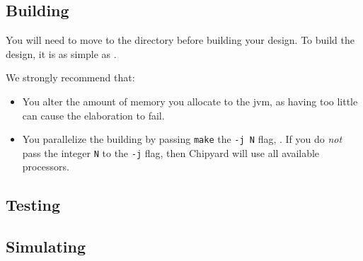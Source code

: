 \subsection{Building}\label{sec:Custom_Config-Building}
You will need to move to the  directory before building your design.
To build the design, it is as simple as .

We strongly recommend that:
\begin{itemize}
\item You alter the amount of memory you allocate to the \Gls{jvm}, as having too little can cause the \gls{elaboration} to fail.
\item You parallelize the building by passing \texttt{make} the \texttt{-j N} flag, .
  If you do \emph{not} pass the integer \texttt{N} to the \texttt{-j} flag, then Chipyard will use all available processors.
\end{itemize}

\subsection{Testing}\label{sec:Custom_Config-Testing}

\subsection{Simulating}\label{sec:Custom_Config-Simulating}

